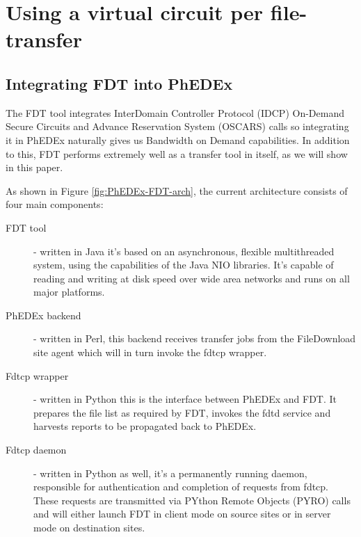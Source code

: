 \section{Using a virtual circuit per file-transfer}

\subsection{Integrating FDT into PhEDEx}
The FDT tool integrates InterDomain Controller Protocol (IDCP)
On-Demand Secure Circuits and Advance Reservation System (OSCARS\cite{OSCARS}) calls so
integrating it in PhEDEx naturally gives us Bandwidth on Demand
capabilities. In addition to this, FDT performs extremely well
as a transfer tool in itself, as we will show in this paper.

As shown in Figure \ref{fig:PhEDEx-FDT-arch}, the current architecture consists
of four main components:
\begin{description}
	\item[FDT tool] - written in Java it's based on an asynchronous, flexible 
multithreaded system, using the capabilities of the Java NIO 
libraries. It's capable of reading and writing at disk speed over wide area 
networks and runs on all major platforms. 
	\item[PhEDEx backend] - written in Perl, this backend
receives transfer jobs from the FileDownload site agent which will in turn 
invoke the fdtcp wrapper. 
	\item[Fdtcp wrapper] - written in Python this is the
interface between PhEDEx and FDT. It prepares the file list as required by FDT, 
invokes the fdtd service and harvests reports to be propagated back to PhEDEx.
	\item[Fdtcp daemon] - written in Python as well, it's
a permanently running daemon, responsible for authentication and completion of requests
from fdtcp. These requests are transmitted via PYthon Remote Objects (PYRO)
calls and will either launch FDT in client mode on source sites or in server
mode on destination sites.
\end{description}

